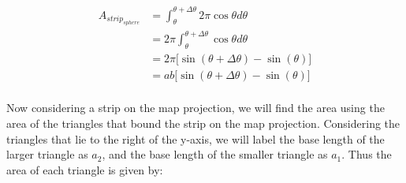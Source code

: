 \documentclass[a4paper]{article}
\begin{document}
\begin{enumerate}[label=(\alph*)]
	\begin{align*}
	A_{strip_{sphere}} & = \int_{\theta}^{\theta + \Delta \theta} 2\pi \cos \theta d\theta\\
	& = 2\pi \int_{\theta}^{\theta + \Delta \theta} \cos{\theta} d\theta\\
	& = 2\pi \Big[\sin(\theta + \Delta \theta) - \sin(\theta)\Big]\\
	& = ab \Big[\sin(\theta + \Delta \theta) - \sin(\theta)\Big]\\
	\end{align*}

	Now considering a strip on the map projection, we will find the area using the area of the triangles that bound the strip on the map projection. Considering the triangles that lie to the right of the y-axis, we will label the base length of the larger triangle as $a_2$, and the base length of the smaller triangle as $a_1$. Thus the area of each triangle is given by:


\end{enumerate}
\end{document}
